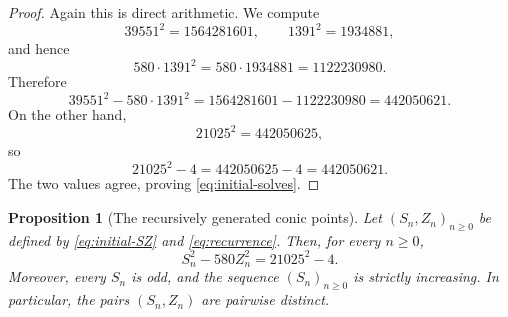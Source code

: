 \documentclass[11pt]{article}
\numberwithin{equation}{section}
\newtheorem{proposition}[theorem]{Proposition}
\begin{document}
\begin{proof}
Again this is direct arithmetic. We compute
\begin{equation*}
        39551^2=1564281601,
        \qquad
        1391^2=1934881,
\end{equation*}
and hence
\begin{equation*}
        580\cdot 1391^2=580\cdot 1934881=1122230980.
\end{equation*}
Therefore
\begin{equation*}
        39551^2-580\cdot 1391^2
        =1564281601-1122230980
        =442050621.
\end{equation*}
On the other hand,
\begin{equation*}
        21025^2=442050625,
\end{equation*}
so
\begin{equation*}
        21025^2-4=442050625-4=442050621.
\end{equation*}
The two values agree, proving \eqref{eq:initial-solves}.
\end{proof}

\begin{proposition}[The recursively generated conic points]\label{prop:conic-points}
Let $(S_n,Z_n)_{n\geq 0}$ be defined by \eqref{eq:initial-SZ} and
\eqref{eq:recurrence}. Then, for every $n\geq 0$,
\begin{equation}\label{eq:all-conic-points}
        S_n^2-580Z_n^2=21025^2-4.
\end{equation}
Moreover, every $S_n$ is odd, and the sequence $(S_n)_{n\geq 0}$ is strictly
increasing. In particular, the pairs $(S_n,Z_n)$ are pairwise distinct.
\end{proposition}
\end{document}
